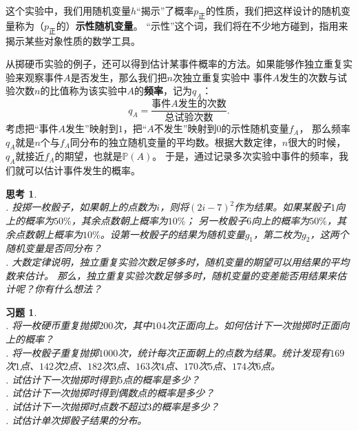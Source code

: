 \documentclass[12pt,UTF8]{ctexbook}
\newtheorem{sk}{思考}[section]
\newtheorem{xt}{习题}[section]
\begin{document}
这个实验中，我们用随机变量$h$“揭示”了概率$p_{\text{正}}$的性质，我们把这样设计的随机变量称为（$p_{\text{正}}$的）\textbf{示性随机变量}。
“示性”这个词，我们将在不少地方碰到，指用来揭示某些对象性质的数学工具。

从掷硬币实验的例子，还可以得到估计某事件概率的方法。如果能够作独立重复实验来观察事件$A$是否发生，那么我们把$n$次独立重复实验中
事件$A$发生的次数与试验次数$n$的比值称为该实验中$A$的\textbf{频率}，记为$q_A$：
$$ q_A = \frac{\mbox{事件}A\mbox{发生的次数}}{\mbox{总试验次数}}.$$
考虑把“事件$A$发生”映射到$1$，把“$A$不发生”映射到$0$的示性随机变量$f_A$，
那么频率$q_A$就是$n$个与$f_A$同分布的独立随机变量的平均数。根据大数定律，$n$很大的时候，$q_A$就接近$f_A$的期望，也就是$\mathbb{P}(A)$。
于是，通过记录多次实验中事件的频率，我们就可以估计事件发生的概率。

\begin{sk}
    \mbox{}\\
    . 投掷一枚骰子，如果朝上的点数为$i$，则将$(2i-7)^2$作为结果。如果某骰子$1$向上的概率为$50\%$，其余点数朝上概率为$10\%$；
    另一枚骰子$6$向上的概率为$50\%$，其余点数朝上概率为$10\%$。设第一枚骰子的结果为随机变量$g_1$，第二枚为$g_2$，这两个随机变量是否同分布？\\
    . 大数定律说明，独立重复实验次数足够多时，随机变量的期望可以用结果的平均数来估计。
    那么，独立重复实验次数足够多时，随机变量的变差能否用结果来估计呢？你有什么想法？
\end{sk}

\begin{xt}
    \mbox{}\\
    . 将一枚硬币重复抛掷$200$次，其中$104$次正面向上。如何估计下一次抛掷时正面向上的概率？\\
    . 将一枚骰子重复抛掷$1000$次，统计每次正面朝上的点数为结果。统计发现有$169$次$1$点、$142$次$2$点、$182$次$3$点、$163$次$4$点、$170$次$5$点、$174$次$6$点。\\
    . 试估计下一次抛掷时得到$5$点的概率是多少？\\
    . 试估计下一次抛掷时得到偶数点的概率是多少？\\
    . 试估计下一次抛掷时点数不超过$3$的概率是多少？\\
    . 试估计单次掷骰子结果的分布。
\end{xt}
\end{document}

